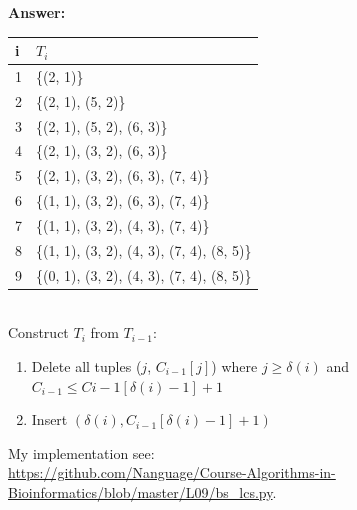\documentclass{article}
\begin{document}
\large{\textbf{Answer:}} \\

\begin{tabular}{l|l}
    \hline
    i & $T_i$ \\
    \hline
    1 & \{(2, 1)\}\\
    2 & \{(2, 1), (5, 2)\}\\
    3 & \{(2, 1), (5, 2), (6, 3)\}\\
    4 & \{(2, 1), (3, 2), (6, 3)\}\\
    5 & \{(2, 1), (3, 2), (6, 3), (7, 4)\}\\
    6 & \{(1, 1), (3, 2), (6, 3), (7, 4)\}\\
    7 & \{(1, 1), (3, 2), (4, 3), (7, 4)\}\\
    8 & \{(1, 1), (3, 2), (4, 3), (7, 4), (8, 5)\} \\
    9 & \{(0, 1), (3, 2), (4, 3), (7, 4), (8, 5)\}
\end{tabular} \\

Construct $T_i$ from $T_{i-1}$:
\begin{enumerate}
    \item Delete all tuples ($j$, $C_{i-1}[j]$) where $j \geq \delta(i)$ and $C_{i-1} \leq C{i-1}[\delta(i) - 1] + 1$
    \item Insert $(\delta(i), C_{i-1}[\delta(i)-1]+1)$
\end{enumerate}

My implementation see: \\
\url{https://github.com/Nanguage/Course-Algorithms-in-Bioinformatics/blob/master/L09/bs_lcs.py}.



\end{document}
